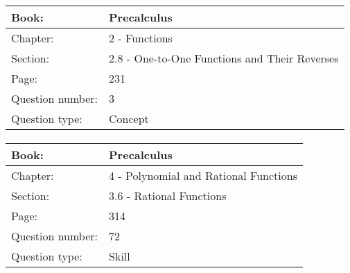 \documentclass{article}
\begin{document}
   \paragraph{}
   \begin{tabularx}{1\textwidth}{
           p{}
           p{}
       }
       \toprule
       Book: & Precalculus
       \\
       \midrule
       Chapter: & 2 - Functions
       \\
       \midrule
       Section: & 2.8 - One-to-One Functions and Their Reverses
       \\
       \midrule
       Page: & 231
       \\
       \midrule
       Question number: & 3
       \\
       \midrule
       Question type: & Concept
       \\
       \bottomrule
   \end{tabularx}



   \paragraph{}
   \begin{tabularx}{1\textwidth}{
           p{}
           p{}
       }
       \toprule
       Book: & Precalculus
       \\
       \midrule
       Chapter: & 4 - Polynomial and Rational Functions
       \\
       \midrule
       Section: & 3.6 - Rational Functions
       \\
       \midrule
       Page: & 314
       \\
       \midrule
       Question number: & 72
       \\
       \midrule
       Question type: & Skill
       \\
       \bottomrule
   \end{tabularx}
\end{document}
